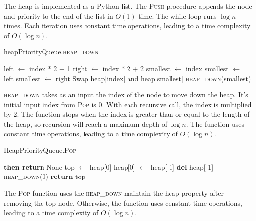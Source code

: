 \documentclass[12pt]{article}
\begin{document}
The heap is implemented as a Python list. The \textsc{Push} procedure appends the
node and priority to the end of the list in $O(1)$ time. The while loop runs $\log{n}$
times. Each iteration uses constant time operations, leading to a time complexity
of $O(\log{n})$.

\begin{algorithm}[H]
    \caption{heapPriorityQueue.\textsc{heap\_down}}
    \begin{algorithmic}[1]
        \State left $\gets$ index * 2 + 1
        \State right $\gets$ index * 2 + 2
        \State smallest $\gets$ index
            \State smallest $\gets$ left
        \EndIf
            \State smallest $\gets$ right
        \EndIf
            \State Swap heap[index] and heap[smallest]
            \State \textsc{heap\_down}(smallest)
        \EndIf
    \end{algorithmic}
\end{algorithm}

\textsc{heap\_down} takes as an input the index of the node to move down the heap.
It's initial input index from \textsc{Pop} is 0. With each recursive call,
the index is multiplied by 2. The function stops when the index is greater than
or equal to the length of the heap, so recursion will reach a maximum depth of
$\log{n}$. The function uses constant time operations, leading to a time complexity
of $O(\log{n})$.

\begin{algorithm}[H]
    \caption{HeapPriorityQueue.\textsc{Pop}}
    \begin{algorithmic}[1]
            \State \textbf{then return} None
        \EndIf
        \State top $\gets$ heap[0]
        \State heap[0] $\gets$ heap[-1]
        \State \textbf{del} heap[-1]
        \State \textsc{heap\_down}(0) 
        \State \textbf{return} top
    \end{algorithmic}
\end{algorithm}

The \textsc{Pop} function uses the \textsc{heap\_down} maintain the heap property
after removing the top node. Otherwise, the function uses constant time operations,
leading to a time complexity of $O(\log{n})$.
\end{document}
